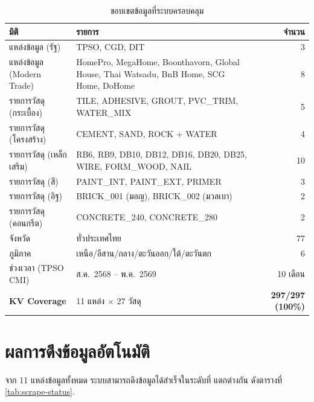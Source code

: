 \begin{table}[H]
\centering
\caption{ขอบเขตข้อมูลที่ระบบครอบคลุม}
\label{tab:coverage}
\begin{tabularx}{\textwidth}{l X r}
\toprule
\textbf{มิติ} & \textbf{รายการ} & \textbf{จำนวน} \\
\midrule
แหล่งข้อมูล (รัฐ)        & TPSO, CGD, DIT                                       & 3 \\
แหล่งข้อมูล (Modern Trade)& HomePro, MegaHome, Boonthavorn, Global House,
                              Thai Watsadu, BnB Home, SCG Home, DoHome              & 8 \\
รายการวัสดุ (กระเบื้อง)   & TILE, ADHESIVE, GROUT, PVC\_TRIM, WATER\_MIX          & 5 \\
รายการวัสดุ (โครงสร้าง)   & CEMENT, SAND, ROCK + WATER                            & 4 \\
รายการวัสดุ (เหล็กเสริม)  & RB6, RB9, DB10, DB12, DB16, DB20, DB25, WIRE, FORM\_WOOD, NAIL & 10 \\
รายการวัสดุ (สี)          & PAINT\_INT, PAINT\_EXT, PRIMER                        & 3 \\
รายการวัสดุ (อิฐ)         & BRICK\_001 (มอญ), BRICK\_002 (มวลเบา)                & 2 \\
รายการวัสดุ (คอนกรีต)     & CONCRETE\_240, CONCRETE\_280                          & 2 \\
จังหวัด                   & ทั่วประเทศไทย                                          & 77 \\
ภูมิภาค                   & เหนือ/อีสาน/กลาง/ตะวันออก/ใต้/ตะวันตก                 & 6 \\
ช่วงเวลา (TPSO CMI)        & ส.ค.\ 2568 -- พ.ค.\ 2569                            & 10 เดือน \\
\midrule
\textbf{KV Coverage}      & 11 แหล่ง $\times$ 27 วัสดุ                           & \textbf{297/297 (100\%)} \\
\bottomrule
\end{tabularx}
\end{table}

\section{ผลการดึงข้อมูลอัตโนมัติ}
\label{sec:scrape-result}

จาก 11 แหล่งข้อมูลทั้งหมด ระบบสามารถดึงข้อมูลได้สำเร็จในระดับที่
แตกต่างกัน ดังตารางที่ \ref{tab:scrape-status}.


